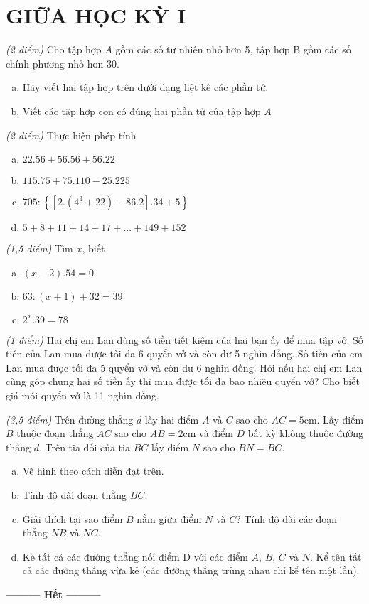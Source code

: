 
\section{GIỮA HỌC KỲ I}
\setcounter{ex}{0}
\begin{ex}  \textit{(2 điểm)}
Cho tập hợp $A$ gồm các số tự nhiên nhỏ hơn 5, tập hợp B gồm các số chính phương nhỏ hơn 30.
\begin{enumerate} [a)]
\item Hãy viết hai tập hợp trên dưới dạng liệt kê các phần tử.
\item Viết các tập hợp con có đúng hai phần tử của tập hợp $A$
\end{enumerate}
\end{ex}    \begin{ex}  \textit{(2 điểm)} Thực hiện phép tính
\begin{enumerate} [a)]
\item $22.56 + 56.56 + 56.22$
\item $115.75 + 75.110 - 25.225$
\item $705:\left\{ {\left[ {2.\left( {{4^3} + 22} \right) - 86.2} \right].34 + 5} \right\}$
\item $5 + 8 + 11 + 14 + 17 + ... + 149 + 152$
\end{enumerate}
\noindent \end{ex}    \begin{ex}  \textit{(1,5 điểm)} Tìm $x$, biết
\begin{enumerate} [a)]
\item $\left( {x - 2} \right).54 = 0$
\item $63:(x + 1) + 32 = 39$
\item ${2^x}.39 = 78$
\end{enumerate}
\end{ex}    \begin{ex}  \textit{(1 điểm)}
Hai chị em Lan dùng số tiền tiết kiệm của hai bạn ấy để mua tập vở. Số tiền của Lan mua được tối đa 6 quyển vở và còn dư 5 nghìn đồng. Số tiền của em Lan mua được tối đa 5 quyển vở và còn dư 6 nghìn đồng. Hỏi nếu hai chị em Lan cùng góp chung hai số tiền ấy thì mua được tối đa bao nhiêu quyển vở? Cho biết giá mỗi quyển vở là 11 nghìn đồng.\\
\end{ex}    \begin{ex}  \textit{(3,5 điểm)}
Trên đường thẳng $d$ lấy hai điểm $A$ và $C$ sao cho $AC = 5$cm. Lấy điểm $B$ thuộc đoạn thẳng $AC$ sao cho $AB = 2$cm và điểm $D$ bất kỳ không thuộc đường thẳng $d$. Trên tia đối của tia $BC$ lấy điểm $N$ sao cho $BN = BC$. 
\begin{enumerate} [a)]
\item	Vẽ hình theo cách diễn đạt trên.
\item	Tính độ dài đoạn thẳng $BC$.
\item	Giải thích tại sao điểm $B$ nằm giữa điểm $N$ và $C$? Tính độ dài các đoạn thẳng $NB$ và $NC$. 
\item	Kẻ tất cả các đường thẳng nối điểm D với các điểm $A$, $B$, $C$ và $N$. Kể tên tất cả các đường thẳng vừa kẻ (các đường thẳng trùng nhau chỉ kể tên một lần).
\end{enumerate}
\end{ex}
\begin{center}
\textbf{\textbf{---------} Hết \textbf{---------}}
\end{center}